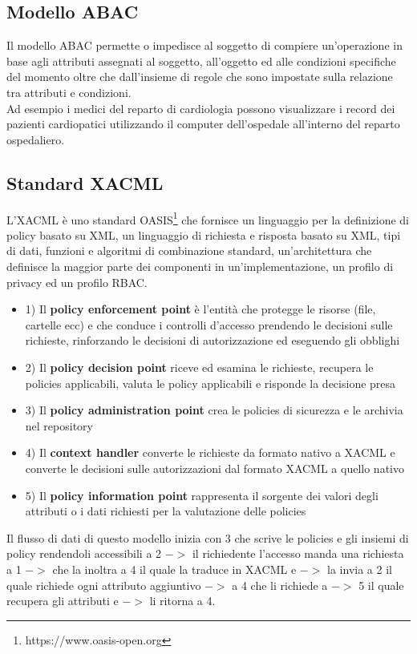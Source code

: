 \subsection{Modello ABAC}
Il modello \acrshort{ABAC} permette o impedisce al soggetto di compiere un'operazione in base agli attributi assegnati al soggetto, all'oggetto ed alle condizioni specifiche del momento oltre che dall'insieme di regole che sono impostate sulla relazione tra attributi e condizioni.\\
Ad esempio i medici del reparto di cardiologia possono visualizzare i record dei pazienti cardiopatici utilizzando il computer dell'ospedale all'interno del reparto ospedaliero.

\subsection{Standard XACML}
L'\acrfull{XACML} è uno standard OASIS\footnote{https://www.oasis-open.org} che fornisce un linguaggio per la definizione di policy basato su \acrshort{XML}, un linguaggio di richiesta e risposta basato su \acrshort{XML}, tipi di dati, funzioni e algoritmi di combinazione standard, un'architettura che definisce la maggior parte dei componenti in un'implementazione, un profilo di privacy ed un profilo \acrshort{RBAC}.
\begin{itemize}[noitemsep]
    \item 1) Il \textbf{policy enforcement point} è l'entità che protegge le risorse (file, cartelle ecc) e che conduce i controlli d'accesso prendendo le decisioni sulle richieste, rinforzando le decisioni di autorizzazione ed eseguendo gli obblighi
    \item 2) Il \textbf{policy decision point} riceve ed esamina le richieste, recupera le policies applicabili, valuta le policy applicabili e risponde la decisione presa
    \item 3) Il \textbf{policy administration point} crea le policies di sicurezza e le archivia nel repository
    \item 4) Il \textbf{context handler} converte le richieste da formato nativo a \acrshort{XACML} e converte le decisioni sulle autorizzazioni dal formato \acrshort{XACML} a quello nativo
    \item 5) Il \textbf{policy information point} rappresenta il sorgente dei valori degli attributi o i dati richiesti per la valutazione delle policies
\end{itemize}
Il flusso di dati di questo modello inizia con 3 che scrive le policies e gli insiemi di policy rendendoli accessibili a 2 $->$ il richiedente l'accesso manda una richiesta a 1 $->$ che la inoltra a 4 il quale la traduce in \acrshort{XACML} e $->$ la invia a 2 il quale richiede ogni attributo aggiuntivo $->$ a 4 che li richiede a $->$ 5 il quale recupera gli attributi e $->$ li ritorna a 4.\\
